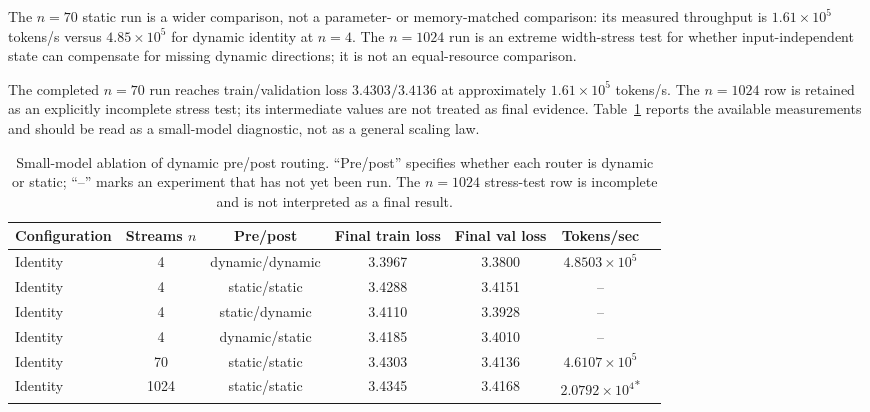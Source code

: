 \documentclass{article}
\begin{document}
The $n=70$ static run is a wider comparison, not a parameter- or memory-matched comparison: its measured throughput is $1.61\times10^5$ tokens/s versus $4.85\times10^5$ for dynamic identity at $n=4$. The $n=1024$ run is an extreme width-stress test for whether input-independent state can compensate for missing dynamic directions; it is not an equal-resource comparison.

The completed $n=70$ run reaches train/validation loss $3.4303/3.4136$ at approximately $1.61\times10^5$ tokens/s. The $n=1024$ row is retained as an explicitly incomplete stress test; its intermediate values are not treated as final evidence. Table~\ref{tab:dynamic-pre-post-ablation} reports the available measurements and should be read as a small-model diagnostic, not as a general scaling law.

\begin{table}[t]
\caption{Small-model ablation of dynamic pre/post routing. ``Pre/post'' specifies whether each router is dynamic or static; ``--'' marks an experiment that has not yet been run. The $n=1024$ stress-test row is incomplete and is not interpreted as a final result.}
\label{tab:dynamic-pre-post-ablation}
\begin{center}
{\setlength{\tabcolsep}{3pt}
\renewcommand{\arraystretch}{0.78}
\scriptsize
\begin{tabular}{l c c c c c l}
\toprule
Configuration & Streams $n$ & Pre/post & Final train loss & Final val loss & Tokens/sec \\
\midrule
Identity & 4 & dynamic/dynamic & 3.3967 & 3.3800 & $4.8503\times10^5$ \\
Identity & 4 & static/static & 3.4288 & 3.4151 & -- \\
Identity & 4 & static/dynamic & 3.4110 & 3.3928 & -- \\
Identity & 4 & dynamic/static & 3.4185 & 3.4010 & -- \\
Identity & 70 & static/static & 3.4303 & 3.4136 & $4.6107\times10^5$ \\
Identity & 1024 & static/static & 3.4345 & 3.4168 & $2.0792\times10^4$\textsuperscript{*} \\
\bottomrule
\end{tabular}}
\end{center}
\vspace{-2pt}
\end{table}
\end{document}
